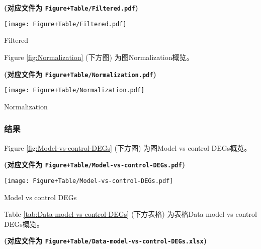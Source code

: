\documentclass[
]{article}
\begin{document}
\textbf{(对应文件为 \texttt{Figure+Table/Filtered.pdf})}

\def\@captype{figure}
\begin{center}
\texttt{[image: Figure+Table/Filtered.pdf]}
\caption{Filtered}\label{fig:Filtered}
\end{center}

Figure \ref{fig:Normalization} (下方图) 为图Normalization概览。

\textbf{(对应文件为 \texttt{Figure+Table/Normalization.pdf})}

\def\@captype{figure}
\begin{center}
\texttt{[image: Figure+Table/Normalization.pdf]}
\caption{Normalization}\label{fig:Normalization}
\end{center}

\hypertarget{ux7ed3ux679c}{%
\subsubsection{结果}\label{ux7ed3ux679c}}

Figure \ref{fig:Model-vs-control-DEGs} (下方图) 为图Model vs control DEGs概览。

\textbf{(对应文件为 \texttt{Figure+Table/Model-vs-control-DEGs.pdf})}

\def\@captype{figure}
\begin{center}
\texttt{[image: Figure+Table/Model-vs-control-DEGs.pdf]}
\caption{Model vs control DEGs}\label{fig:Model-vs-control-DEGs}
\end{center}

Table \ref{tab:Data-model-vs-control-DEGs} (下方表格) 为表格Data model vs control DEGs概览。

\textbf{(对应文件为 \texttt{Figure+Table/Data-model-vs-control-DEGs.xlsx})}
\end{document}
